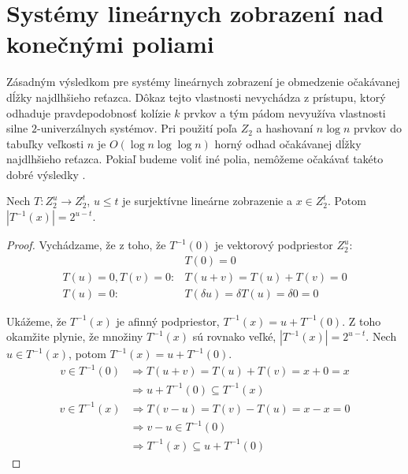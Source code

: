 \chapter{Systémy lineárnych zobrazení nad konečnými poliami}

Zásadným výsledkom pre systémy lineárnych zobrazení je obmedzenie očakávanej dĺžky najdlhšieho reťazca. Dôkaz tejto vlastnosti nevychádza z prístupu, ktorý odhaduje pravdepodobnosť kolízie $k$ prvkov a tým pádom nevyužíva vlastnosti silne $2$-univerzálnych systémov. Pri použití poľa $Z_2$ a hashovaní $n \log n$ prvkov do tabuľky veľkosti $n$ je $O(\log n \log \log n)$ horný odhad očakávanej dĺžky najdlhšieho reťazca. Pokiaľ budeme voliť iné polia, nemôžeme očakávať takéto dobré výsledky \cite{linear-hash-functions}.

\begin{lemma}
\label{lemma-linear-transformation-domain-distribution}
Nech $T: Z_2^u \rightarrow Z_2^t$, $u \leq t$ je surjektívne lineárne zobrazenie a $x \in Z_2^t$. Potom $|T^{-1}(x)| = 2 ^ {u-t}$.
\end{lemma}
\begin{proof}
Vychádzame, že z toho, že $T^{-1}(0)$ je vektorový podpriestor $Z_2^u$:
\begin{displaymath}
\begin{split}
& T(0) = 0 \\
T(u) = 0, T(v) = 0: & T(u + v) = T(u) + T(v) = 0 \\
T(u) = 0: & T(\delta u) = \delta T(u) = \delta 0 = 0
\end{split}
\end{displaymath}

Ukážeme, že $T^{-1}(x)$ je afinný podpriestor, $T^{-1}(x) = u + T^{-1}(0)$. Z toho okamžite plynie, že množiny $T^{-1}(x)$ sú rovnako veľké, $|T^{-1}(x)| = 2^{u-t}$. Nech $u \in T^{-1}(x)$, potom $T^{-1}(x) = u + T^{-1}(0)$.
\begin{displaymath}
\begin{split}
v \in T^{-1}(0) 
	& \Rightarrow T(u+v) = T(u) + T(v) = x + 0 = x  \\
	& \Rightarrow u + T^{-1}(0) \subseteq T^{-1}(x)
\end{split}
\end{displaymath}
\begin{displaymath}
\begin{split}
v \in T^{-1}(x) 
	& \Rightarrow T(v-u) = T(v) - T(u) = x - x = 0 \\
	& \Rightarrow v - u \in T^{-1}(0) \\
	& \Rightarrow T^{-1}(x) \subseteq u + T^{-1}(0)
\end{split}
\end{displaymath}
\end{proof}

